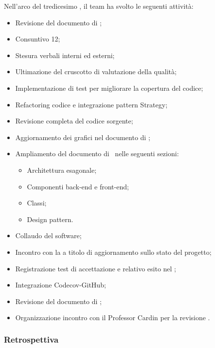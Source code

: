 Nell'arco del tredicesimo , il team ha svolto le seguenti attività:
\begin{itemize}
  \item Revisione del documento di \AdR;
  \item Consuntivo  12;
  \item Stesura verbali interni ed esterni;
  \item Ultimazione del cruscotto di valutazione della qualità;
  \item Implementazione di test  per migliorare la copertura del codice;
  \item Refactoring codice  e integrazione pattern Strategy;
  \item Revisione completa del codice sorgente;
  \item Aggiornamento dei grafici nel documento di \ST;
  \item Ampliamento del documento di \ST\ nelle seguenti sezioni:
  \begin{itemize}
    \item Architettura esagonale;
    \item Componenti back-end e front-end;
    \item Classi;
    \item Design pattern.
  \end{itemize}
  \item Collaudo del software;
  \item Incontro con la  a titolo di aggiornamento sullo stato del progetto;
  \item Registrazione test di accettazione e relativo esito nel \PdQ;
  \item Integrazione Codecov-GitHub;
  \item Revisione del documento di \ST;
  \item Organizzazione incontro con il Professor Cardin per la revisione .
\end{itemize}

\subsubsection{Retrospettiva}

